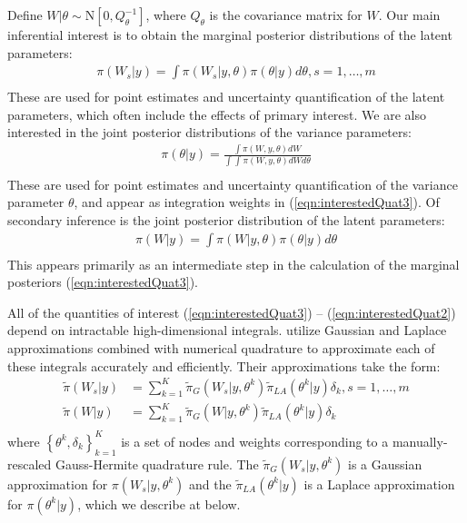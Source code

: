 \documentclass[ba]{imsart}
\begin{document}
Define $W|\theta\sim\text{N}\left[ 0,Q^{-1}_{\theta}\right]$, where $Q_{\theta}$ is the covariance matrix for $W$. Our main inferential interest is to obtain the marginal posterior distributions of the latent parameters:
\begin{equation}\begin{aligned}\label{eqn:interestedQuat3}
\pi(W_{s}|y) = \int \pi(W_{s}|y,\theta) \pi(\theta|y) d\theta, s = 1,\ldots,m  \\
\end{aligned}\end{equation}
These are used for point estimates and uncertainty quantification of the latent parameters, which often include the effects of primary interest. We are also interested in the joint posterior distributions of the variance parameters:
\begin{equation}\begin{aligned}\label{eqn:interestedQuat1}
\pi(\theta|y) = \frac{\int \pi(W,y,\theta) dW}{\int_{} \int_{} \pi(W,y,\theta) dW d\theta } \\
\end{aligned}\end{equation}
These are used for point estimates and uncertainty quantification of the variance parameter $\theta$, and appear as integration weights in (\ref{eqn:interestedQuat3}). Of secondary inference is the joint posterior distribution of the latent parameters:
\begin{equation}\begin{aligned}\label{eqn:interestedQuat2}
\pi(W|y) = \int \pi(W|y,\theta) \pi(\theta|y) d\theta  \\
\end{aligned}\end{equation}
This appears primarily as an intermediate step in the calculation of the marginal posteriors (\ref{eqn:interestedQuat3}).

All of the quantities of interest (\ref{eqn:interestedQuat3}) -- (\ref{eqn:interestedQuat2}) depend on intractable high-dimensional integrals. \cite{casecross} utilize Gaussian and Laplace approximations combined with numerical quadrature to approximate each of these integrals accurately and efficiently. Their approximations take the form:
\begin{equation}\begin{aligned}\label{eqn:integration}
\tilde{\pi}(W_{s}|y) &= \sum_{k=1}^{K}
\tilde{\pi}_{G}(W_{s}|y,\theta^{k})
\tilde{\pi}_{LA}(\theta^{k}|y)\delta_{k}, s = 1,\ldots,m \\
\tilde{\pi}(W|y) &= \sum_{k=1}^{K}
\tilde{\pi}_{G}(W|y,\theta^{k})
\tilde{\pi}_{LA}(\theta^{k}|y)\delta_{k} \\
\end{aligned}\end{equation}
where $\left\{\theta^{k},\delta_{k}\right\}_{k=1}^{K}$ is a set of nodes and weights corresponding to a manually-rescaled Gauss-Hermite quadrature rule. The $\tilde{\pi}_{G}(W_{s}|y,\theta^{k})$ is a Gaussian approximation for $\pi(W_{s}|y,\theta^{k})$ and the $\tilde{\pi}_{LA}(\theta^{k}|y)$ is a Laplace approximation for $\pi(\theta^{k}|y)$, which we describe at below.
\end{document}
